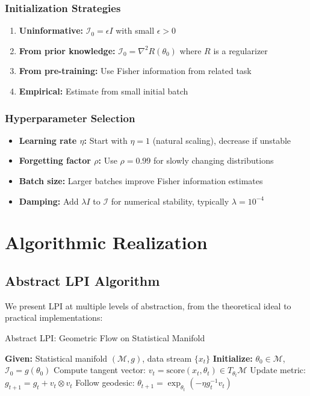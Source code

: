 \documentclass[11pt]{article}
\begin{document}
\subsubsection{Initialization Strategies}

\begin{enumerate}
\item \textbf{Uninformative:} $\mathcal{I}_0 = \epsilon I$ with small $\epsilon > 0$
\item \textbf{From prior knowledge:} $\mathcal{I}_0 = \nabla^2 R(\theta_0)$ where $R$ is a regularizer
\item \textbf{From pre-training:} Use Fisher information from related task
\item \textbf{Empirical:} Estimate from small initial batch
\end{enumerate}

\subsubsection{Hyperparameter Selection}

\begin{itemize}
\item \textbf{Learning rate $\eta$:} Start with $\eta = 1$ (natural scaling), decrease if unstable
\item \textbf{Forgetting factor $\rho$:} Use $\rho = 0.99$ for slowly changing distributions
\item \textbf{Batch size:} Larger batches improve Fisher information estimates
\item \textbf{Damping:} Add $\lambda I$ to $\mathcal{I}$ for numerical stability, typically $\lambda = 10^{-4}$
\end{itemize}

\section{Algorithmic Realization}

\subsection{Abstract LPI Algorithm}

We present LPI at multiple levels of abstraction, from the theoretical ideal to practical implementations:

\begin{algorithm}[h]
\caption{Abstract LPI: Geometric Flow on Statistical Manifold}
\label{alg:abstract_lpi}
\begin{algorithmic}[1]
\State \textbf{Given:} Statistical manifold $(\mathcal{M}, g)$, data stream $\{x_t\}$
\State \textbf{Initialize:} $\theta_0 \in \mathcal{M}$, $\mathcal{I}_0 = g(\theta_0)$
\State Compute tangent vector: $v_t = \text{score}(x_t, \theta_t) \in T_{\theta_t}\mathcal{M}$
\State Update metric: $g_{t+1} = g_t + v_t \otimes v_t$
\State Follow geodesic: $\theta_{t+1} = \exp_{\theta_t}(-\eta g_t^{-1} v_t)$
\EndWhile
\end{algorithmic}
\end{algorithm}
\end{document}
